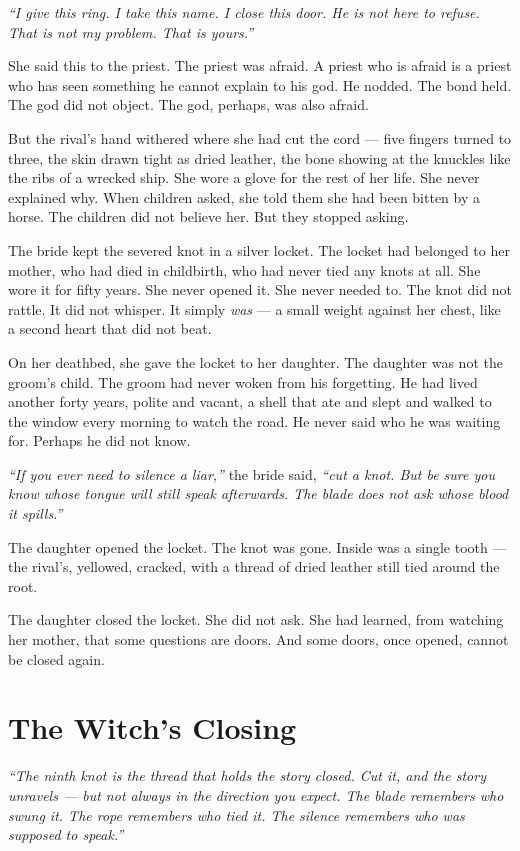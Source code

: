 \textit{``I give this ring. I take this name. I close this door. He is not here to refuse. That is not my problem. That is yours.''}

She said this to the priest. The priest was afraid. A priest who is afraid is a priest who has seen something he cannot explain to his god. He nodded. The bond held. The god did not object. The god, perhaps, was also afraid.

But the rival's hand withered where she had cut the cord --- five fingers turned to three, the skin drawn tight as dried leather, the bone showing at the knuckles like the ribs of a wrecked ship. She wore a glove for the rest of her life. She never explained why. When children asked, she told them she had been bitten by a horse. The children did not believe her. But they stopped asking.

The bride kept the severed knot in a silver locket. The locket had belonged to her mother, who had died in childbirth, who had never tied any knots at all. She wore it for fifty years. She never opened it. She never needed to. The knot did not rattle. It did not whisper. It simply \textit{was} --- a small weight against her chest, like a second heart that did not beat.

On her deathbed, she gave the locket to her daughter. The daughter was not the groom's child. The groom had never woken from his forgetting. He had lived another forty years, polite and vacant, a shell that ate and slept and walked to the window every morning to watch the road. He never said who he was waiting for. Perhaps he did not know.

\textit{``If you ever need to silence a liar,''} the bride said, \textit{``cut a knot. But be sure you know whose tongue will still speak afterwards. The blade does not ask whose blood it spills.''}

The daughter opened the locket. The knot was gone. Inside was a single tooth --- the rival's, yellowed, cracked, with a thread of dried leather still tied around the root.

The daughter closed the locket. She did not ask. She had learned, from watching her mother, that some questions are doors. And some doors, once opened, cannot be closed again.

\section*{The Witch's Closing}

\textit{``The ninth knot is the thread that holds the story closed. Cut it, and the story unravels --- but not always in the direction you expect. The blade remembers who swung it. The rope remembers who tied it. The silence remembers who was supposed to speak.''}

